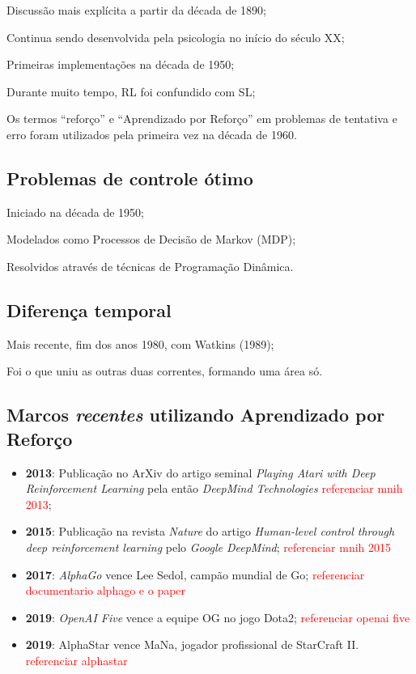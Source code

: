 \documentclass{article}
\begin{document}
            Discussão mais explícita a partir da década de 1890;
            
            Continua sendo desenvolvida pela psicologia no início do século XX;
            
            Primeiras implementações na década de 1950;
            
            Durante muito tempo, RL foi confundido com SL;
            
            Os termos “reforço” e “Aprendizado por Reforço” em problemas de tentativa e erro foram utilizados pela primeira vez na década de 1960.
    
        
        \subsection{Problemas de controle ótimo}
            Iniciado na década de 1950;
            
            Modelados como Processos de Decisão de Markov (MDP);
            
            Resolvidos através de técnicas de Programação Dinâmica.
    
        
        \subsection{Diferença temporal}
            Mais recente, fim dos anos 1980, com Watkins     (1989);
            
            Foi o que uniu as outras duas correntes, formando uma área só.
            
        \subsection{Marcos \emph{recentes} utilizando Aprendizado por Reforço}
        
            \begin{itemize}
                \item \textbf{2013}: Publicação no ArXiv do artigo seminal \emph{Playing Atari with Deep Reinforcement Learning} pela então \emph{DeepMind Technologies} \textcolor{red}{referenciar mnih 2013};
                \item \textbf{2015}: Publicação na revista \emph{Nature} do artigo \emph{Human-level control through deep reinforcement learning} pelo \emph{Google DeepMind}; \textcolor{red}{referenciar mnih 2015}
                \item \textbf{2017}: \emph{AlphaGo} vence Lee Sedol, campão mundial de Go;  \textcolor{red}{referenciar documentario alphago e o paper}
                \item \textbf{2019}: \emph{OpenAI Five} vence a equipe OG no jogo Dota2;  \textcolor{red}{referenciar openai five}
                \item \textbf{2019}: AlphaStar vence MaNa, jogador profissional de StarCraft II. \textcolor{red}{referenciar alphastar}
            \end{itemize}
\end{document}
